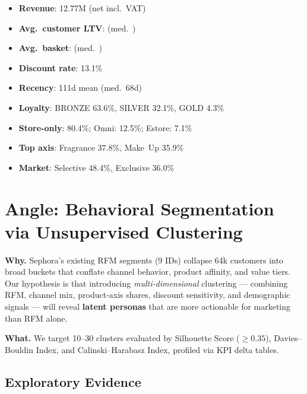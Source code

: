 \documentclass[9pt,a4paper]{article}
\begin{document}
\begin{minipage}[t]{0.48\textwidth}
\footnotesize
\begin{itemize}
  \item \textbf{Revenue}: \texteuro12.77M (net incl.\ VAT)
  \item \textbf{Avg.\ customer LTV}:  (med.\ )
  \item \textbf{Avg.\ basket}:  (med.\ )
  \item \textbf{Discount rate}: 13.1\%
  \item \textbf{Recency}: 111d mean (med.\ 68d)
\end{itemize}
\end{minipage}
\hfill
\begin{minipage}[t]{0.48\textwidth}
\footnotesize
\begin{itemize}
  \item \textbf{Loyalty}: BRONZE 63.6\%, SILVER 32.1\%, GOLD 4.3\%
  \item \textbf{Store-only}: 80.4\%; Omni: 12.5\%; Estore: 7.1\%
  \item \textbf{Top axis}: Fragrance 37.8\%, Make~Up 35.9\%
  \item \textbf{Market}: Selective 48.4\%, Exclusive 36.0\%
\end{itemize}
\end{minipage}

\section{Angle: Behavioral Segmentation via Unsupervised Clustering}

\textbf{Why.} Sephora's existing RFM segments (9 IDs) collapse 64k customers into broad buckets that conflate channel behavior, product affinity, and value tiers.
Our hypothesis is that introducing \emph{multi-dimensional} clustering --- combining RFM, channel mix, product-axis shares, discount sensitivity, and demographic signals --- will reveal \textbf{latent personas} that are more actionable for marketing than RFM alone.

\textbf{What.} We target 10--30 clusters evaluated by Silhouette Score ($\geq 0.35$), Davies--Bouldin Index, and Calinski--Harabasz Index, profiled via KPI delta tables.

\subsection{Exploratory Evidence}
\end{document}
